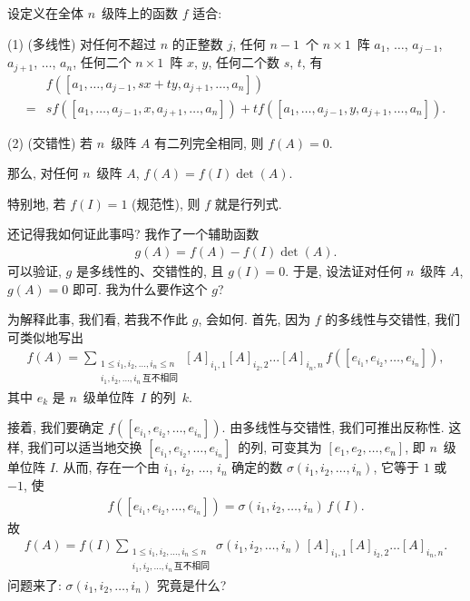 \begin{theorem}
    设定义在全体 \(n\)~级阵上的函数 \(f\) 适合:

    (1)
    (多线性)
    对任何不超过 \(n\) 的正整数 \(j\),
    任何 \(n-1\)~个 \(n \times 1\)~阵
    \(a_1\), \(\dots\), \(a_{j-1}\),
    \(a_{j+1}\), \(\dots\), \(a_n\),
    任何二个 \(n \times 1\)~阵 \(x\), \(y\),
    任何二个数 \(s\), \(t\),
    有
    \begin{align*}
             & f
            {([a_1, \dots, a_{j-1}, sx + ty,
                        a_{j+1}, \dots, a_n])}
        \\
        = {} &
        s
        f {([a_1, \dots, a_{j-1}, x, a_{j+1}, \dots, a_n])}
        +
        t
        f {([a_1, \dots, a_{j-1}, y, a_{j+1}, \dots, a_n])}.
    \end{align*}

    (2)
    (交错性)
    若 \(n\)~级阵 \(A\) 有二列完全相同,
    则 \(f {(A)} = 0\).

    那么, 对任何 \(n\)~级阵 \(A\),
    \(f(A) = f(I) \det {(A)}\).

    特别地, 若 \(f(I) = 1\) (规范性),
    则 \(f\) 就是行列式.
\end{theorem}

还记得我如何证此事吗?
我作了一个辅助函数
\begin{align*}
    g(A) = f(A) - f(I) \det {(A)}.
\end{align*}
可以验证, \(g\) 是多线性的、交错性的,
且 \(g(I) = 0\).
于是, 设法证对任何 \(n\)~级阵 \(A\),
\(g(A) = 0\) 即可.
我为什么要作这个 \(g\)?

为解释此事, 我们看,
若我不作此 \(g\), 会如何.
首先, 因为 \(f\) 的多线性与交错性,
我们可类似地写出
\begin{align*}
    f(A)
    = \sum_{\substack{
    1 \leq i_1, i_2, \dots, i_n \leq n \\
            i_1, i_2, \dots, i_n\,\text{互不相同}
        }}
    {[A]_{i_1,1} [A]_{i_2,2} \dots [A]_{i_n,n}\,
        f([e_{i_1}, e_{i_2}, \dots, e_{i_n}])},
\end{align*}
其中 \(e_k\) 是 \(n\)~级单位阵~\(I\) 的列~\(k\).

接着, 我们要确定
\(f([e_{i_1}, e_{i_2}, \dots, e_{i_n}])\).
由多线性与交错性, 我们可推出反称性.
这样, 我们可以适当地交换
\([e_{i_1}, e_{i_2}, \dots, e_{i_n}]\)~的列,
可变其为 \([e_1, e_2, \dots, e_n]\),
即 \(n\)~级单位阵 \(I\).
从而, 存在一个由 \(i_1\), \(i_2\), \(\dots\), \(i_n\)
确定的数 \(\sigma (i_1, i_2, \dots, i_n)\),
它等于 \(1\) 或 \(-1\),
使
\begin{align*}
    f([e_{i_1}, e_{i_2}, \dots, e_{i_n}])
    = \sigma (i_1, i_2, \dots, i_n)\, f(I).
\end{align*}
故
\begin{align*}
    f(A)
    = f(I) \sum_{\substack{
    1 \leq i_1, i_2, \dots, i_n \leq n \\
            i_1, i_2, \dots, i_n\,\text{互不相同}
        }}
    {\sigma (i_1, i_2, \dots, i_n)\,
        [A]_{i_1,1} [A]_{i_2,2} \dots [A]_{i_n,n}}.
\end{align*}
问题来了: \(\sigma (i_1, i_2, \dots, i_n)\)
究竟是什么?

